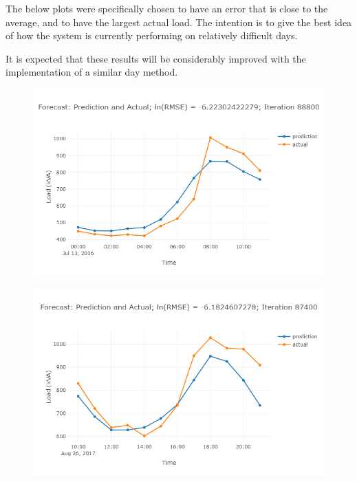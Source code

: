 The below plots were specifically chosen to have an error that is close to the average, and to have the largest actual load. The intention is to give the best idea of how the system is currently performing on relatively difficult days.

It is expected that these results will be considerably improved with the implementation of a similar day method.
\begin{figure}
	\centering
	\includegraphics[width=0.95\linewidth]{images/prelim-plots/newplot}
	\caption{}
\end{figure}

\begin{figure}
\centering
\includegraphics[width=0.95\linewidth]{"images/prelim-plots/newplot (1)"}
\caption{}
\end{figure}

